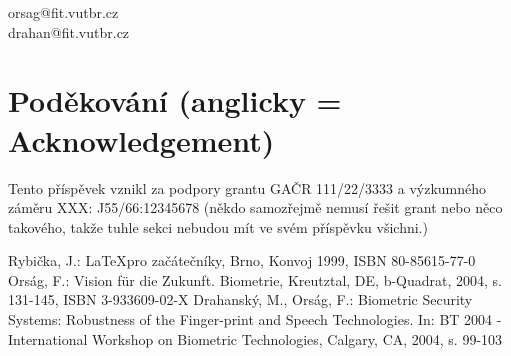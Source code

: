 \documentclass{eeict}
\begin{document}
\begin{center}
orsag@fit.vutbr.cz\\
drahan@fit.vutbr.cz
\end{center}

%
\section*{Poděkování (anglicky = Acknowledgement)}
Tento příspěvek vznikl za podpory grantu GAČR 111/22/3333 a výzkumného
záměru XXX: J55/66:12345678 (někdo samozřejmě nemusí řešit grant nebo
něco takového, takže tuhle sekci nebudou mít ve svém příspěvku všichni.)

%
\begin{thebibliography}{9}
   Rybička, J.: \LaTeX pro začátečníky, Brno, Konvoj 1999,
            ISBN 80-85615-77-0
   Orság, F.: Vision für die Zukunft. Biometrie, Kreutztal,
            DE, b-Quadrat, 2004, s. 131-145, ISBN 3-933609-02-X
   Drahanský, M., Orság, F.: Biometric Security Systems:
    Robustness of the Finger-print and Speech Technologies. In: BT 2004 - 
    International Workshop on Biometric Technologies, Calgary, CA, 2004,
    s. 99-103
\end{thebibliography}
\end{document}
